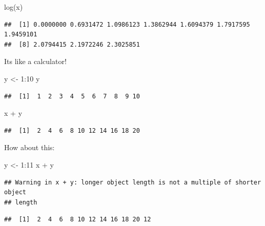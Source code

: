 \documentclass[
]{book}
\newenvironment{Shaded}{\begin{snugshade}}{\end{snugshade}}
\newcommand{\DecValTok}[1]{\textcolor[rgb]{0.00,0.00,0.81}{#1}}
\newcommand{\FunctionTok}[1]{\textcolor[rgb]{0.00,0.00,0.00}{#1}}
\newcommand{\NormalTok}[1]{#1}
\newcommand{\OtherTok}[1]{\textcolor[rgb]{0.56,0.35,0.01}{#1}}
\newcommand{\SpecialCharTok}[1]{\textcolor[rgb]{0.00,0.00,0.00}{#1}}
\begin{document}
\begin{Shaded}
\begin{Highlighting}[]
\FunctionTok{log}\NormalTok{(x)}
\end{Highlighting}
\end{Shaded}

\begin{verbatim}
##  [1] 0.0000000 0.6931472 1.0986123 1.3862944 1.6094379 1.7917595 1.9459101
##  [8] 2.0794415 2.1972246 2.3025851
\end{verbatim}

Its like a calculator!

\begin{Shaded}
\begin{Highlighting}[]
\NormalTok{y }\OtherTok{\textless{}{-}} \DecValTok{1}\SpecialCharTok{:}\DecValTok{10}
\NormalTok{y}
\end{Highlighting}
\end{Shaded}

\begin{verbatim}
##  [1]  1  2  3  4  5  6  7  8  9 10
\end{verbatim}

\begin{Shaded}
\begin{Highlighting}[]
\NormalTok{x }\SpecialCharTok{+}\NormalTok{ y}
\end{Highlighting}
\end{Shaded}

\begin{verbatim}
##  [1]  2  4  6  8 10 12 14 16 18 20
\end{verbatim}

How about this:

\begin{Shaded}
\begin{Highlighting}[]
\NormalTok{y }\OtherTok{\textless{}{-}} \DecValTok{1}\SpecialCharTok{:}\DecValTok{11}
\NormalTok{x }\SpecialCharTok{+}\NormalTok{ y}
\end{Highlighting}
\end{Shaded}

\begin{verbatim}
## Warning in x + y: longer object length is not a multiple of shorter object
## length
\end{verbatim}

\begin{verbatim}
##  [1]  2  4  6  8 10 12 14 16 18 20 12
\end{verbatim}
\end{document}
